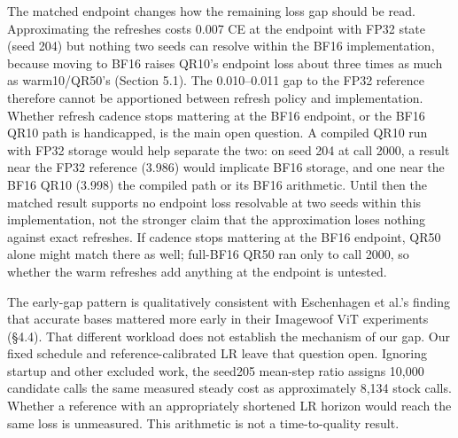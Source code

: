 The matched endpoint changes how the remaining loss gap should be read.
Approximating the refreshes costs 0.007 CE at the endpoint with FP32
state (seed 204) but nothing two seeds can resolve within the BF16
implementation, because moving to BF16 raises QR10's endpoint loss
about three times as much as warm10/QR50's (Section 5.1). The
0.010--0.011 gap to the FP32 reference therefore cannot be apportioned
between refresh policy and implementation. Whether
refresh cadence stops mattering at the BF16 endpoint, or the BF16 QR10
path is handicapped, is the main open question. A compiled QR10 run
with FP32 storage would help separate the two: on seed 204 at call
2000, a result near the FP32 reference (3.986) would implicate BF16
storage, and one near the BF16 QR10 (3.998) the compiled path or its
BF16 arithmetic. Until then the matched result supports no endpoint
loss resolvable at two seeds within this implementation, not the
stronger claim that the approximation loses nothing against exact
refreshes. If cadence stops mattering at the BF16 endpoint, QR50 alone
might match there as well; full-BF16 QR50 ran only to call 2000, so
whether the warm refreshes add anything at the endpoint is untested.

The early-gap pattern is qualitatively consistent with Eschenhagen et
al.'s finding that accurate bases mattered more early in their Imagewoof
ViT experiments (§4.4). That different workload does not establish the
mechanism of our gap. Our fixed schedule and reference-calibrated LR
leave that question open. Ignoring startup and other excluded work, the
seed205 mean-step ratio assigns 10,000 candidate calls the same measured
steady cost as approximately 8,134 stock calls. Whether a reference with
an appropriately shortened LR horizon would reach the same loss is
unmeasured. This arithmetic is not a time-to-quality result.
